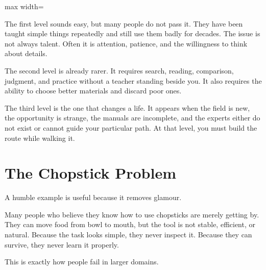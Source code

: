 \begin{center}
\begin{adjustbox}{max width=\linewidth}
\end{adjustbox}
\end{center}

The first level sounds easy, but many people do not pass it. They have been taught simple things repeatedly and still use them badly for decades. The issue is not always talent. Often it is attention, patience, and the willingness to think about details.

The second level is already rarer. It requires search, reading, comparison, judgment, and practice without a teacher standing beside you. It also requires the ability to choose better materials and discard poor ones.

The third level is the one that changes a life. It appears when the field is new, the opportunity is strange, the manuals are incomplete, and the experts either do not exist or cannot guide your particular path. At that level, you must build the route while walking it.

\section*{The Chopstick Problem}

A humble example is useful because it removes glamour.

Many people who believe they know how to use chopsticks are merely getting by. They can move food from bowl to mouth, but the tool is not stable, efficient, or natural. Because the task looks simple, they never inspect it. Because they can survive, they never learn it properly.

This is exactly how people fail in larger domains.

